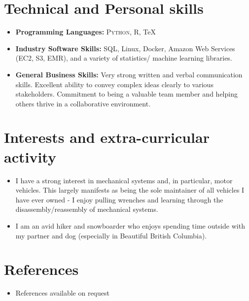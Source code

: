 \documentclass[11pt,a4paper,sans]{moderncv}        %
\begin{document}
\section{Technical and Personal skills}

\vspace{6pt}

\begin{itemize}

\item \textbf{Programming Languages:} \textsc{Python}, \textsc{R}, TeX 

\vspace{6pt}

\item \textbf{Industry Software Skills:} SQL, Linux, Docker, Amazon Web Services (EC2, S3, EMR), and a variety of statistics/ machine learning libraries.

\vspace{6pt}

\item \textbf{General Business Skills:} Very strong written and verbal communication skills. Excellent ability to convey complex ideas clearly to various stakeholders. Commitment to being a valuable team member and helping others thrive in a collaborative environment.

\end{itemize}

\section{Interests and extra-curricular activity}

\vspace{6pt}

\begin{itemize}



\item{I have a strong interest in mechanical systems and, in particular, motor vehicles. 
This largely manifests as being the sole maintainer of all vehicles I have ever owned -
I enjoy pulling wrenches and learning through the disassembly/reassembly of mechanical systems.}

\vspace{6pt}

\item{I am an avid hiker and snowboarder who enjoys spending time outside with my partner 
and dog (especially in Beautiful British Columbia).}

\end{itemize}

\section{References}

\vspace{6pt}
 
\begin{itemize}

\item{References available on request}

\end{itemize}

\nocite{*}

 
\end{document}
